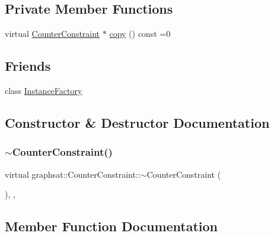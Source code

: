 \subsection*{Private Member Functions}
\begin{DoxyCompactItemize}
\item 
virtual \mbox{\hyperlink{classgraphsat_1_1_counter_constraint}{Counter\+Constraint}} $\ast$ \mbox{\hyperlink{classgraphsat_1_1_counter_constraint_a880eb6520fcf80de35071d62cb31a640}{copy}} () const =0
\end{DoxyCompactItemize}
\subsection*{Friends}
\begin{DoxyCompactItemize}
\item 
class \mbox{\hyperlink{classgraphsat_1_1_counter_constraint_ad4b3c25c041701ae56dc1e78df779d2f}{Instance\+Factory}}
\end{DoxyCompactItemize}


\subsection{Constructor \& Destructor Documentation}
\mbox{\label{classgraphsat_1_1_counter_constraint_af84f6083e587b99f5af0fdaa36e62a56}} 
\subsubsection{\texorpdfstring{$\sim$CounterConstraint()}{~CounterConstraint()}}
{\footnotesize\ttfamily virtual graphsat\+::\+Counter\+Constraint\+::$\sim$\+Counter\+Constraint (\begin{DoxyParamCaption}{ }\end{DoxyParamCaption})\hspace{0.3cm}{\ttfamily [inline]}, {\ttfamily [protected]}, {\ttfamily [virtual]}}



\subsection{Member Function Documentation}
\mbox{\label{classgraphsat_1_1_counter_constraint_a880eb6520fcf80de35071d62cb31a640}} 
